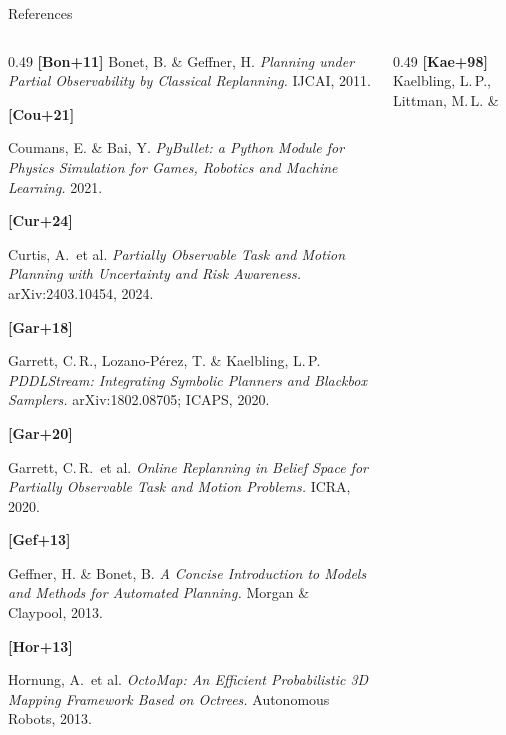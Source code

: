 \documentclass[aspectratio=169, 11pt]{beamer}
\newcommand{\rc}[2]{{\footnotesize\,(#1\;\hyperlink{ref:#2}{{\color{i6blue!60}[#2]}})}}
\begin{document}
\appendix
\setcounter{framenumber}{0}

\begin{frame}{References}
  \scriptsize
  \begin{columns}[T]
    \begin{column}{0.49\textwidth}
      \hypertarget{ref:Bon+11}{\color{i6blue!60}\textbf{[Bon+11]}} Bonet, B. \& Geffner, H. \emph{Planning
       under Partial Observability by Classical Replanning.} IJCAI, 2011.\par\smallskip
      \hypertarget{ref:Cou+21}{\color{i6blue!60}\textbf{[Cou+21]}} Coumans, E. \& Bai, Y. \emph{PyBullet: a
       Python Module for Physics Simulation for Games, Robotics and Machine
       Learning.} 2021.\par\smallskip
      \hypertarget{ref:Cur+24}{\color{i6blue!60}\textbf{[Cur+24]}} Curtis, A.\ et al. \emph{Partially
       Observable Task and Motion Planning with Uncertainty and Risk Awareness.}
       arXiv:2403.10454, 2024.\par\smallskip
      \hypertarget{ref:Gar+18}{\color{i6blue!60}\textbf{[Gar+18]}} Garrett, C.\,R., Lozano-P\'erez, T. \&
       Kaelbling, L.\,P. \emph{PDDLStream: Integrating Symbolic Planners and
       Blackbox Samplers.} arXiv:1802.08705; ICAPS, 2020.\par\smallskip
      \hypertarget{ref:Gar+20}{\color{i6blue!60}\textbf{[Gar+20]}} Garrett, C.\,R.\ et al. \emph{Online
       Replanning in Belief Space for Partially Observable Task and Motion
       Problems.} ICRA, 2020.\par\smallskip
      \hypertarget{ref:Gef+13}{\color{i6blue!60}\textbf{[Gef+13]}} Geffner, H. \& Bonet, B. \emph{A Concise
       Introduction to Models and Methods for Automated Planning.} Morgan \&
       Claypool, 2013.\par\smallskip
      \hypertarget{ref:Hor+13}{\color{i6blue!60}\textbf{[Hor+13]}} Hornung, A.\ et al. \emph{OctoMap: An
       Efficient Probabilistic 3D Mapping Framework Based on Octrees.} Autonomous
       Robots, 2013.
    \end{column}
    \begin{column}{0.49\textwidth}
      \hypertarget{ref:Kae+98}{\color{i6blue!60}\textbf{[Kae+98]}} Kaelbling, L.\,P., Littman, M.\,L. \&

\end{column}
\end{columns}
\end{frame}
\end{document}
